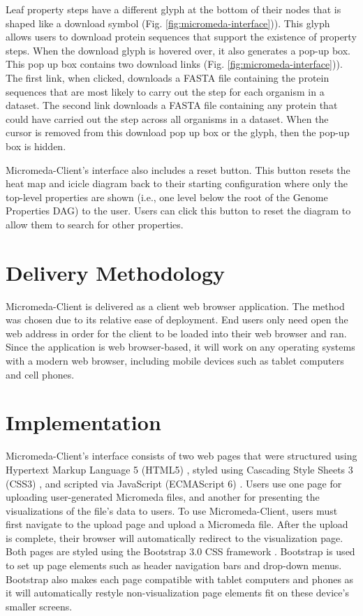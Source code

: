 Leaf property steps have a different glyph at the bottom of their nodes that is shaped like a download symbol (Fig. \ref{fig:micromeda-interface})). This glyph allows users to download protein sequences that support the existence of property steps. When the download glyph is hovered over, it also generates a pop-up box. This pop up box contains two download links (Fig. \ref{fig:micromeda-interface})). The first link, when clicked, downloads a FASTA file containing the protein sequences that are most likely to carry out the step for each organism in a dataset. The second link downloads a FASTA file containing any protein that could have carried out the step across all organisms in a dataset. When the cursor is removed from this download pop up box or the glyph, then the pop-up box is hidden.

Micromeda-Client's interface also includes a reset button. This button resets the heat map and icicle diagram back to their starting configuration where only the top-level properties are shown (i.e., one level below the root of the Genome Properties DAG) to the user. Users can click this button to reset the diagram to allow them to search for other properties.

\section{Delivery Methodology}

Micromeda-Client is delivered as a client web browser application. The method was chosen due to its relative ease of deployment. End users only need open the web address in order for the client to be loaded into their web browser and ran. Since the application is web browser-based, it will work on any operating systems with a modern web browser, including mobile devices such as tablet computers and cell phones.

\section{Implementation}

Micromeda-Client's interface consists of two web pages that were structured using Hypertext Markup Language 5 (HTML5) \cite{HTML5}, styled using Cascading Style Sheets 3 (CSS3) \cite{CSS3}, and scripted via JavaScript (ECMAScript 6) \cite{flanagan2006javascript}. Users use one page for uploading user-generated Micromeda files, and another for presenting the visualizations of the file's data to users. To use Micromeda-Client, users must first navigate to the upload page and upload a Micromeda file. After the upload is complete, their browser will automatically redirect to the visualization page. Both pages are styled using the Bootstrap 3.0 CSS framework \cite{spurlock2013bootstrap}. Bootstrap is used to set up page elements such as header navigation bars and drop-down menus. Bootstrap also makes each page compatible with tablet computers and phones as it will automatically restyle non-visualization page elements fit on these device's smaller screens.

